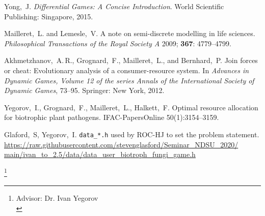\documentclass[11pt]{amsart}
\begin{document}
\begin{thebibliography}{}
Yong,~J.
{\it Differential Games{\rm :} A Concise Introduction}.
World Scientific Publishing: Singapore, 2015.

Mailleret,~L. and Lemesle,~V.
A note on semi-discrete modelling in life sciences.
{\it Philosophical Transactions of the Royal Society A} 2009; {\bf 367}:
4779--4799.

Akhmetzhanov,~A.\,R., Grognard,~F., Mailleret,~L., and Bernhard,~P.
Join forces or cheat: Evolutionary analysis of a consumer-resource system.
In {\it Advances in Dynamic Games{\rm ,}
Volume {\rm 12} of the series Annals of the International Society of Dynamic
Games}, 73--95.
Springer: New York, 2012.

Yegorov,~I., Grognard,~F., Mailleret,~L., Halkett,~F.
Optimal resource allocation for biotrophic plant
pathogens.
IFAC-PapersOnline 50(1):3154–3159.

Glaford,~S, Yegorov,~I.
\texttt{data\_*.h} used by ROC-HJ to set the problem statement.
\url{https://raw.githubusercontent.com/stevenglasford/Seminar_NDSU_2020/
main/ivan_to_2.5/data/data_user_biotroph_fungi_game.h}

\end{thebibliography}

\hspace{1in}

\noindent\thanks{Advisor: Dr. Ivan Yegorov\\}
\address{Department of Mathematics, North Dakota State University, PO Box 6050,
Fargo, ND 58108-6050, USA}
\end{document}
